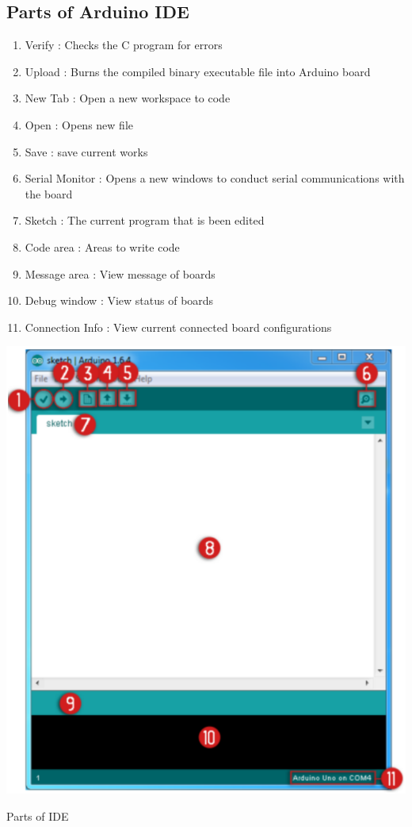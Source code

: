 \subsection{Parts of Arduino IDE}

\begin{enumerate}
    \item Verify : Checks the C program for errors
    \item Upload : Burns the compiled binary executable file into Arduino board
    \item New Tab : Open a new workspace to code
    \item Open : Opens new file
    \item Save : save current works
    \item Serial Monitor : Opens a new windows to conduct serial communications with the board
    \item Sketch : The current program that is been edited
    \item Code area : Areas to write code
    \item Message area : View message of boards
    \item Debug window : View status of boards
    \item Connection Info : View current connected board configurations
\end{enumerate}

\begin{marginfigure}
    \vspace{-9cm} \includegraphics{Images/Programing_Arduino/ide_parts.png}
    \caption{Parts of \ac{IDE}}
\end{marginfigure}

